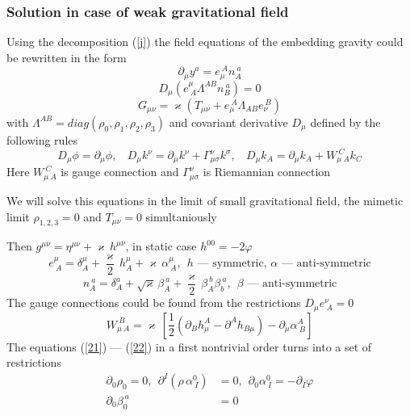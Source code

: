 \documentclass[serif,professionalfonts]{beamer}
\begin{document}
\begin{frame}
\frametitle{Solution in case of weak gravitational field}
Using the decomposition (\ref{j}) the field equations of the embedding gravity could be rewritten in the form
\begin{equation}
\label{20}
	\partial_{\mu} y^a = e_{\mu}^{\ A} n_{A}^{\ a}
\end{equation} 
\begin{equation}
\label{21}
	D_{\mu}\left( e^{\mu}_{\ A} \Lambda^{AB} n_{B}^{\ a} \right) = 0
\end{equation}
\begin{equation}
\label{22}
	G_{\mu \nu} = \varkappa \left( T_{\mu \nu} + e_{\mu}^{\ A} \Lambda_{A B} e_{\nu}^{\ B} \right)
\end{equation}
with $\Lambda^{A B} = diag(\rho_0, \rho_1, \rho_2, \rho_3)$ and covariant derivative $D_{\mu}$ defined by the following rules
\begin{equation}
	D_{\mu} \phi = \partial_{\mu} \phi, \ \ \ \ D_{\mu} k^{\nu} = \partial_{\mu} k^{\nu} + \Gamma^{\nu}_{\mu \sigma} k^{\sigma}, \ \ \ \ D_{\mu} k_{A} = \partial_{\mu} k_{A} + W_{\mu \ A}^{\ C} k_{C} 
\end{equation}
Here $W_{\mu \ A}^{\ C}$ is gauge connection and $\Gamma^{\nu}_{\mu \sigma}$ is Riemannian connection 
\end{frame}

\begin{frame}
We will solve this equations in the limit of small gravitational field, the mimetic limit $\rho_{1,2,3}=0$ and $T_{\mu \nu} = 0$ simultaniously

Then $g^{\mu \nu} = \eta^{\mu \nu} + \varkappa \, h^{\mu \nu}$, in static case $h^{00} = - 2 \varphi $
\begin{equation}
	e^{\mu}_{\ A}  = \delta_{A}^{\mu} + \frac{\varkappa}{2} \, h_{A}^{\mu} + \varkappa \, \alpha^{\mu} _{\ A}, \ \ \text{$h$ --- symmetric, $\alpha$ --- anti-symmetric}
\end{equation}
\begin{equation}
	n_{A}^{\ a} = \delta_{A}^{a} + \sqrt{\varkappa} \, \beta_{A}^{\ a} + \frac{\varkappa}{2} \, \beta_{A}^{\ b} \beta_{b}^{\ a}, \ \ \text{$\beta$ --- anti-symmetric}
\end{equation}
The gauge connections could be found from the restrictions $D_{\mu} e^{\nu}_{\ A} = 0$
\begin{equation}
	W_{\mu \ A}^{\ B} = \varkappa \, \left[ \frac{1}{2} \left( \partial_B h^{A}_{\mu} - \partial^{A} h_{B \mu} \right) - \partial_{\mu} \alpha^{A}_{\ B} \right]
\end{equation}
The equations (\ref{21}) --- (\ref{22}) in a first nontrivial order turns into a set of restrictions
\begin{equation}
\begin{split}
	\partial_0 \rho_0 = 0, \ \ \partial^{I} \left( \rho \, \alpha^{0}_{\ I} \right) &= 0, \ \ \partial_0 \alpha^{0}_{\ I} = -\partial_{I} \varphi \\
	\partial_0 \beta_{0}^{\ a} &= 0
\end{split}
\end{equation}
\end{frame}
\end{document}

